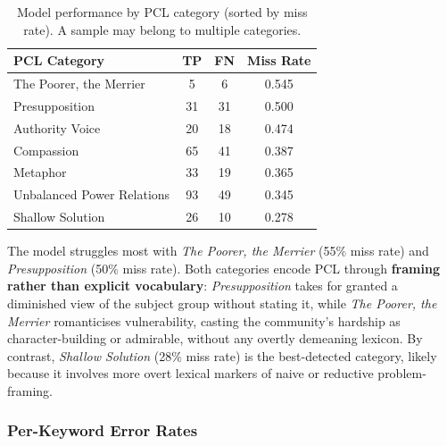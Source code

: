 \documentclass[11pt,a4paper]{article}
\begin{document}
\begin{table}[H]
    \centering
    \begin{tabular}{lccc}
        \toprule
        \textbf{PCL Category}      & \textbf{TP} & \textbf{FN} & \textbf{Miss Rate} \\
        \midrule
        The Poorer, the Merrier    & 5           & 6           & 0.545              \\
        Presupposition             & 31          & 31          & 0.500              \\
        Authority Voice            & 20          & 18          & 0.474              \\
        Compassion                 & 65          & 41          & 0.387              \\
        Metaphor                   & 33          & 19          & 0.365              \\
        Unbalanced Power Relations & 93          & 49          & 0.345              \\
        Shallow Solution           & 26          & 10          & 0.278              \\
        \bottomrule
    \end{tabular}
    \caption{Model performance by PCL category (sorted by miss rate). A sample may belong to multiple categories.}
    \label{tab:cat}
\end{table}

The model struggles most with \textit{The Poorer, the Merrier} (55\% miss rate) and \textit{Presupposition} (50\% miss rate). Both categories encode PCL through \textbf{framing rather than explicit vocabulary}: \textit{Presupposition} takes for granted a diminished view of the subject group without stating it, while \textit{The Poorer, the Merrier} romanticises vulnerability, casting the community's hardship as character-building or admirable, without any overtly demeaning lexicon. By contrast, \textit{Shallow Solution} (28\% miss rate) is the best-detected category, likely because it involves more overt lexical markers of naive or reductive problem-framing.

\subsubsection{Per-Keyword Error Rates}
\end{document}
